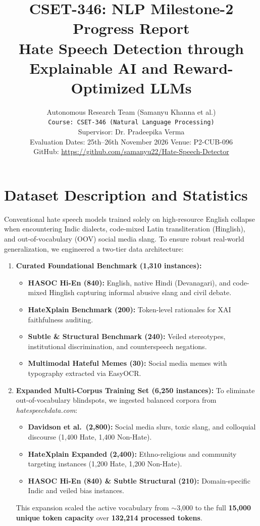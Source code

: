 \documentclass[10pt,twocolumn]{article}
\title{\textbf{CSET-346: NLP Milestone-2 Progress Report \\ Hate Speech Detection through Explainable AI and Reward-Optimized LLMs}}
\author{
  Autonomous Research Team (Samanyu Khanna et al.) \\
  \texttt{Course: CSET-346 (Natural Language Processing)} \\
  Supervisor: Dr. Pradeepika Verma \\
  Evaluation Dates: 25th--26th November 2026 \quad Venue: P2-CUB-096 \\
  GitHub: \url{https://github.com/samanyu22/Hate-Speech-Detector}
}
\date{}
\begin{document}
\maketitle

\section{Dataset Description and Statistics}
Conventional hate speech models trained solely on high-resource English collapse when encountering Indic dialects, code-mixed Latin transliteration (Hinglish), and out-of-vocabulary (OOV) social media slang. To ensure robust real-world generalization, we engineered a two-tier data architecture:
\begin{enumerate}
    \item \textbf{Curated Foundational Benchmark (1,310 instances):}
    \begin{itemize}
        \item \textbf{HASOC Hi-En (840):} English, native Hindi (Devanagari), and code-mixed Hinglish capturing informal abusive slang and civil debate.
        \item \textbf{HateXplain Benchmark (200):} Token-level rationales for XAI faithfulness auditing.
        \item \textbf{Subtle \& Structural Benchmark (240):} Veiled stereotypes, institutional discrimination, and counterspeech negations.
        \item \textbf{Multimodal Hateful Memes (30):} Social media memes with typography extracted via EasyOCR.
    \end{itemize}
    \item \textbf{Expanded Multi-Corpus Training Set (6,250 instances):}
    To eliminate out-of-vocabulary blindspots, we ingested balanced corpora from \textit{hatespeechdata.com}:
    \begin{itemize}
        \item \textbf{Davidson et al.\ (2,800):} Social media slurs, toxic slang, and colloquial discourse (1,400 Hate, 1,400 Non-Hate).
        \item \textbf{HateXplain Expanded (2,400):} Ethno-religious and community targeting instances (1,200 Hate, 1,200 Non-Hate).
        \item \textbf{HASOC Hi-En (840) \& Subtle Structural (210):} Domain-specific Indic and veiled bias instances.
    \end{itemize}
    This expansion scaled the active vocabulary from $\sim$3,000 to the full \textbf{15,000 unique token capacity} over \textbf{132,214 processed tokens}.
\end{enumerate}
\end{document}
